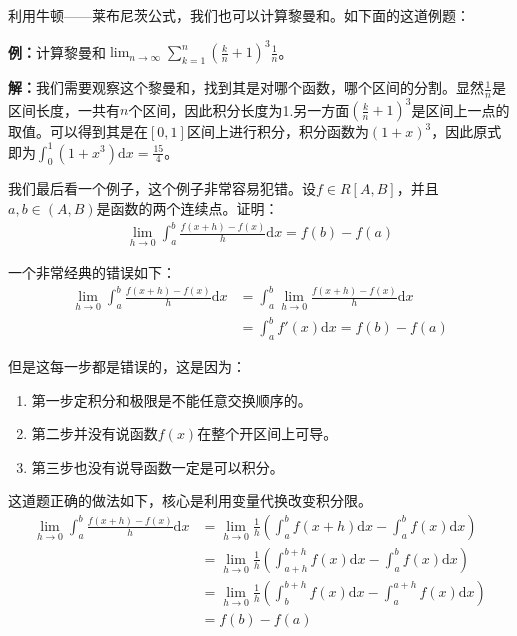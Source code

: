 \documentclass{ctexart}
\let\oldtextbf\textbf %
\renewcommand{\textbf}[1]{\textcolor{btex}{\oldtextbf{#1}}} %
\begin{document}
利用牛顿——莱布尼茨公式，我们也可以计算黎曼和。如下面的这道例题：

\textbf{例：}计算黎曼和$\lim_{n\to\infty}\sum_{k=1}^n (\frac{k}{n}+1)^3\frac{1}{n}$。

\textbf{解：}我们需要观察这个黎曼和，找到其是对哪个函数，哪个区间的分割。显然$\frac{1}{n}$是区间长度，一共有$n$个区间，因此积分长度为1.另一方面$(\frac{k}{n}+1)^3$是区间上一点的取值。可以得到其是在$[0,1]$区间上进行积分，积分函数为$(1+x)^3$，因此原式即为$\int_0^1 (1+x^3)\mathrm{d}x=\frac{15}{4}$。

我们最后看一个例子，这个例子非常容易犯错。设$f\in R[A,B]$，并且$a,b\in(A,B)$是函数的两个连续点。证明：
\begin{align*}
    \lim_{h\to 0}\int_a^b\frac{f(x+h)-f(x)}{h}\mathrm{d}x=f(b)-f(a)
\end{align*}

\begin{tcolorbox}[
    colback=bac2,     %
    colframe=fra2,   %
    coltitle=white,             %
    coltext=tex2,
    title=错误证法,
    fonttitle=\bfseries,        %
arc=3mm,                     %
breakable
]
一个非常经典的错误如下：
\begin{align*}
    \lim_{h\to 0}\int_a^b\frac{f(x+h)-f(x)}{h}\mathrm{d}x&=\int_a^b\lim_{h\to 0}\frac{f(x+h)-f(x)}{h}\mathrm{d}x\\
    &=\int_a^b f'(x)\mathrm{d}x=f(b)-f(a)
\end{align*}

但是这每一步都是错误的，这是因为：
\begin{enumerate}
    \item 第一步定积分和极限是不能任意交换顺序的。
    \item 第二步并没有说函数$f(x)$在整个开区间上可导。
    \item 第三步也没有说导函数一定是可以积分。
\end{enumerate}
\end{tcolorbox}

这道题正确的做法如下，核心是利用变量代换改变积分限。
\begin{align*}
     \lim_{h\to 0}\int_a^b\frac{f(x+h)-f(x)}{h}\mathrm{d}x&=\lim_{h\to 0}\frac{1}{h}\left(\int_a^b f(x+h)\mathrm{d}x-\int_a^b f(x)\mathrm{d}x\right)\\
     &=\lim_{h\to 0}\frac{1}{h}\left(\int_{a+h}^{b+h} f(x)\mathrm{d}x-\int_a^b f(x)\mathrm{d}x\right)\\
     &=\lim_{h\to 0}\frac{1}{h}\left(\int_b^{b+h} f(x)\mathrm{d}x-\int_a^{a+h} f(x)\mathrm{d}x\right)\\
     &=f(b)-f(a)
\end{align*}
\end{document}
